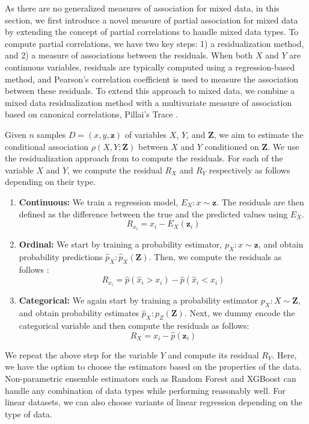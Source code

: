\documentclass{uai2025} %
\begin{document}
As there are no generalized measures of association for mixed data, in this
section, we first introduce a novel measure of partial association for mixed
data by extending the concept of partial correlations \citep{Whittaker2009}
 to handle mixed data types. To compute partial
correlations, we have two key steps: 1) a residualization method, and 2) a
measure of associations between the residuals. When both $ X $ and $ Y $ are
continuous variables, residuals are typically computed using a regression-based
method, and Pearson's correlation coefficient is used to measure the
association between these residuals. To extend this approach to mixed data, we
combine a mixed data residualization method \citep{Ankan2023} with a
multivariate measure of association based on canonical correlations, Pillai's
Trace \citep{Pillai1955}. 

Given $ n $ samples $ D = (x, y, \bm{z}) $ of variables $ X $, $ Y $, and $
\bm{Z} $, we aim to estimate the conditional association $ \rho(X, Y; \bm{Z}) $
between $ X $ and $ Y $ conditioned on $ \bm{Z} $. We use the residualization
approach from \citet{Ankan2023} to compute the residuals. For each of the
variable $ X $ and $ Y $, we compute the residual $ R_X $ and $R_Y$
respectively as follows depending on their type.

\begin{enumerate}
	\item \textbf{Continuous:} We train a regression model, $ E_X: x \sim
		\bm{z} $. The residuals are then defined as the difference
		between the true and the predicted values using $ E_X $. 
		$$ R_{x_i} = x_i - E_X(\bm{z}_i) $$
	\item \textbf{Ordinal:} We start by training a probability estimator, $
		p_X: x \sim \bm{z} $, and obtain probability predictions 
		$ \hat{p}_X: \hat{p}_X(\bm{Z}) $. Then, we compute the residuals
		as follows \citep{Li2012}:
		$$ R_{x_i} = \hat{p}(\hat{x}_i > x_i) - \hat{p}(\hat{x}_i < x_i) $$
	\item \textbf{Categorical:} We again start by training a probability
		estimator $ p_X: X \sim \bm{Z} $, and obtain probability
		estimates $ \hat{p}_X: p_Z(\bm{Z}) $. Next, we dummy encode the
		categorical variable and then compute the residuals as follows: 
		$$ R_X = x_i - \hat{p}(\bm{z}_i) $$
\end{enumerate}


We repeat the above step for the variable $ Y $ and compute its residual $ R_Y
$. Here, we have the option to choose the estimators based on the properties of
the data. Non-parametric ensemble estimators such as Random Forest and XGBoost
can handle any combination of data types while performing reasonably well. For
linear datasets, we can also choose variants of linear regression depending on
the type of data. 
\end{document}
